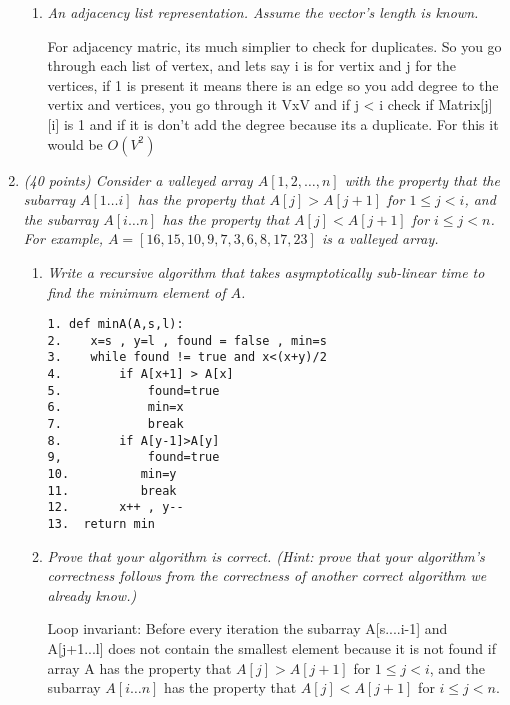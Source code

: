 \documentclass[12pt]{article}
\begin{document}
\begin{enumerate}
\begin{enumerate}
	\item \textit{An {\em adjacency list} representation. Assume the vector's length is known.}

For adjacency matric, its much simplier to check for duplicates. So you go through each list of vertex, and lets say i is for vertix and j for the vertices, if 1 is present it means there is an edge so you add degree to the vertix and vertices, you go through it VxV and if j < i check if Matrix[j][i] is 1 and if it is don’t add the degree because its a duplicate. For this it would be $O(V^2)$ 

	\end{enumerate}
	
	\pagebreak
    
    \item \textit{(40 points) Consider a valleyed array $A[1, 2, \ldots, n]$ with the property that the subarray $A[1\ldots i]$ has the property that $A[j] > A[j + 1]$ for $1 \leq j < i$, and the subarray $A[i \ldots n]$ has the property that $A[j] < A[j + 1]$ for $i \leq j < n$. For example, \newline $A = [16, 15, 10, 9, 7, 3, 6, 8, 17, 23]$ is a valleyed array.}
    
    \begin{enumerate}
        \item \textit{Write a recursive algorithm that takes asymptotically sub-linear time to find the minimum element of $A$.}

		\begin{verbatim}
1. def minA(A,s,l):
2.    x=s , y=l , found = false , min=s
3.    while found != true and x<(x+y)/2
4.        if A[x+1] > A[x]
5.            found=true
6.            min=x
7.            break
8.        if A[y-1]>A[y]
9,            found=true
10.          min=y
11.          break
12.       x++ , y--
13.  return min
	\end{verbatim}

        \item \textit{Prove that your algorithm is correct. (Hint: prove that your algorithm's correctness follows from the correctness of another correct algorithm we already know.)}

Loop invariant: Before every iteration the subarray A[s....i-1] and A[j+1...l] does not contain the smallest element because it is not found if  array A has the property that $A[j] > A[j + 1]$ for $1 \leq j < i$, and the subarray $A[i \ldots n]$ has the property that $A[j] < A[j + 1]$ for $i \leq j < n$.\\


\end{enumerate}
\end{enumerate}
\end{document}

